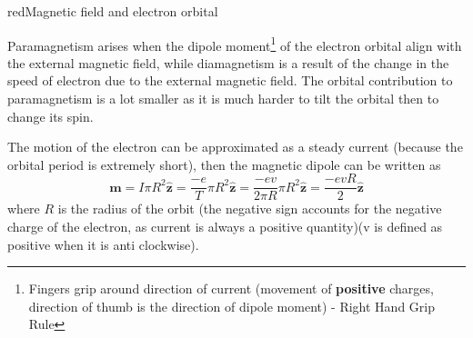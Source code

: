 \documentclass[12pt,a4paper]{extreport}
\numberwithin{equation}{chapter}
\let\oldhat\hat
\renewcommand{\hat}[1]{\oldhat{\mathbf{#1}}}
\begin{document}
\begin{mybox}{red}{Magnetic field and electron orbital}
\begin{center}

        \end{center} 

        Paramagnetism arises when the dipole moment\footnote{Fingers grip around direction of current (movement of \textbf{positive} charges, direction of thumb is the direction of dipole moment) - Right Hand Grip Rule} of the electron orbital align with the external magnetic field, while diamagnetism is a result of the change in the speed of electron due to the external magnetic field. The orbital contribution to paramagnetism is a lot smaller as it is much harder to tilt the orbital then to change its spin. 

        The motion of the electron can be approximated as a steady current (because the orbital period is extremely short), then the magnetic dipole can be written as
        \begin{equation}
            \mathbf{m}=I\pi R^2 \hat{z}= \frac{-e}{T}\pi R^2 \hat{z} =\frac{-ev}{2\pi R}\pi R^2 \hat{z}=\frac{-evR}{2}\hat{z}
        \end{equation}
        where $R$ is the radius of the orbit (the negative sign accounts for the negative charge of the electron, as current is always a positive quantity)(v is defined as positive when it is anti clockwise).


\end{mybox}
\end{document}
